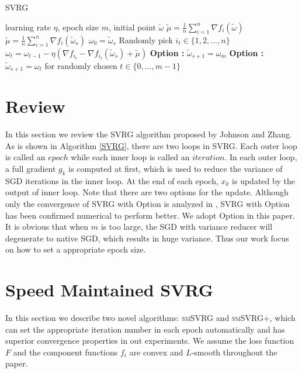 \documentclass[conference]{IEEEtran}
\begin{document}
 \begin{algorithm}[t]
 	\caption{\textsc{SVRG}}
	\label{SVRG}
	\begin{algorithmic}[1]
	\Require learning rate $\eta$,  epoch size $m$, initial point $\tilde{\omega}$
	\State $\tilde{\mu} = \frac{1}{n}\sum\limits_{i=1}^{n}\nabla f_{i}(\tilde{\omega})$
		\State $\tilde{\mu} = \frac{1}{n}\sum\limits_{i=1}^{n}\nabla f_{i}(\tilde{\omega}_{s})$
		\State $\omega_0 = \tilde{\omega}_s$
			\State Randomly pick $i_t\in\{1, 2, ..., n\}$
			\State $\omega_t = \omega_{t-1} - \eta(\nabla f_{i_t} - \nabla f_{i_t}(\tilde{\omega}_s)+\tilde{\mu})$
		\EndFor
		\State \textbf{Option \uppercase\expandafter{}:} $\tilde{\omega}_{s+1} = \omega_{m}$
		\State \textbf{Option \uppercase\expandafter{}:} $\tilde{\omega}_{s+1} = \omega_{t}$ for randomly chosen $t \in \{0, ... ,m - 1\}$ 
	\EndFor
	\end{algorithmic}
\end{algorithm}


\section{Review}
 In this section we review the SVRG algorithm proposed by Johnson and Zhang\citep{Johnson:9MAvkbgy}.  As is shown in Algorithm \ref{SVRG}, there are two loops in SVRG. Each outer loop is called an $epoch$ while each inner loop is called an $iteration$. In each outer loop, a full gradient $g_k$ is computed at first, which is used to reduce the variance of SGD iterations in the inner loop. At the end of each epoch, $x_k$ is updated by the output of inner loop. Note that there are two options for the update. Although only the convergence of SVRG with Option \uppercase\expandafter{} is analyzed in \citep{Johnson:9MAvkbgy}, SVRG with Option \uppercase\expandafter{} has been confirmed numerical to perform better. We adopt Option \uppercase\expandafter{} in this paper. It is obvious that when $m$ is too large, the SGD with variance reducer will degenerate to native SGD, which results in huge variance. Thus our work focus on how to set a appropriate epoch size.
 
 \section{Speed Maintained SVRG}
 \label{mywork}
 In this section we describe two novel algorithms: \textsc{smSVRG} and \textsc{smSVRG+}, which can set the appropriate iteration number in each epoch automatically and has superior convergence properties in out experiments.
 We assume the loss function $F$ and the component functions $f_i$ are convex and $L$-smooth throughout the paper.
 
\end{document}
